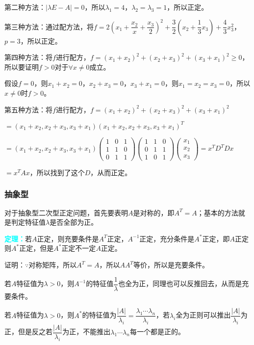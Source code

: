 第二种方法：$\vert\lambda E-A\vert=0$，所以$\lambda_1=4$，$\lambda_2=\lambda_3=1$，所以正定。

第三种方法：通过配方法，将$f=2\left(x_1+\dfrac{x_2}{x}+\dfrac{x_3}{2}\right)^2+\dfrac{3}{2}\left(x_2+\dfrac{1}{3}x_3\right)+\dfrac{4}{3}x_3^2$，$p=3$，所以正定。

第四种方法：将$f$进行配方，$f=(x_1+x_2)^2+(x_2+x_3)^2+(x_3+x_1)^2\geqslant0$，所以要证明$f>0$对于$\forall x\neq0$成立。

假设$f=0$，则$x_1+x_2=0$，$x_2+x_3=0$，$x_3+x_1=0$，则$x_1=x_2=x_3=0$，所以$x\neq0$时$f>0$。

第五种方法：将$f$进行配方，$f=(x_1+x_2)^2+(x_2+x_3)^2+(x_3+x_1)^2$

$=(x_1+x_2,x_2+x_3,x_3+x_1)(x_1+x_2,x_2+x_3,x_3+x_1)^T$

$=(x_1+x_2,x_2+x_3,x_3+x_1)\left(\begin{array}{ccc}
    1 & 0 & 1 \\
    1 & 1 & 0 \\
    0 & 1 & 1
\end{array}\right)\left(\begin{array}{ccc}
    1 & 1 & 0 \\
    0 & 1 & 1 \\
    1 & 0 & 1
\end{array}\right)\left(\begin{array}{c}
    x_1 \\
    x_2 \\
    x_3
\end{array}\right)=x^TD^TDx$

$=x^TAx$，所以找到了这个$D$，从而正定。

\subsubsection{抽象型}

对于抽象型二次型正定问题，首先要表明$A$是对称的，即$A^T=A$；基本的方法就是判定特征值$\lambda$是否全部为正。

\textcolor{aqua}{\textbf{定理：}}若$A$正定，则充要条件是$A^T$正定，$A^{-1}$正定，充分条件是$A^*$正定，即$A$正定则$A^*$正定，但是$A^*$正定不一定$A$正定。

证明：$\because$对称矩阵，所以$A^T=A$，所以$AA^T$等价，所以是充要条件。

若$A$特征值为$\lambda>0$，则$A^{-1}$的特征值$\dfrac{1}{\lambda}$也全为正，同理也可以反推回去，从而是充要条件。

若$A$特征值为$\lambda>0$，则$A^*$的特征值为$\dfrac{\vert A\vert}{\lambda_i}=\dfrac{\lambda_1\cdots\lambda_n}{\lambda_i}$，若$\lambda_i$全为正则可以推出$\dfrac{\vert A\vert}{\lambda_i}$为正，但是反之若$\dfrac{\vert A\vert}{\lambda_i}$为正，不能推出$\lambda_1\cdots\lambda_n$每一个都是正的。

%
